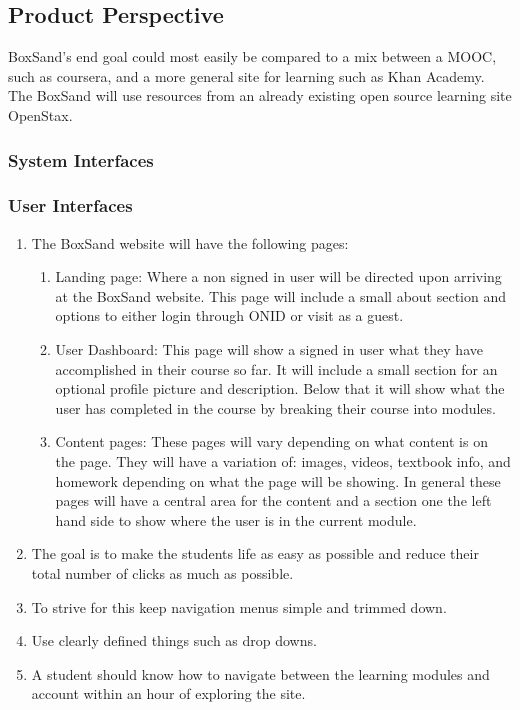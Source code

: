 \documentclass[onecolumn, draftclsnofoot,10pt, compsoc]{IEEEtran}
\begin{document}
\subsection{Product Perspective}
BoxSand's end goal could most easily be compared to a mix between a MOOC, such as coursera, and a more general site for learning such as Khan Academy. The BoxSand will use resources from an already existing open source learning site OpenStax.

\subsubsection{System Interfaces}

\subsubsection{User Interfaces}

\begin{enumerate}
\item The BoxSand website will have the following pages:
\begin{enumerate}
\item Landing page: Where a non signed in user will be directed upon arriving at the BoxSand website. This page will include a small about section and options to either login through ONID or visit as a guest. 
\item User Dashboard: This page will show a signed in user what they have accomplished in their course so far. It will include a small section for an optional profile picture and description. Below that it will show what the user has completed in the course by breaking their course into modules.
\item Content pages: These pages will vary depending on what content is on the page. They will have a variation of: images, videos, textbook info, and homework depending on what the page will be showing. In general these pages will have a central area for the content and a section one the left hand side to show where the user is in the current module. 
\end{enumerate}
\item The goal is to make the students life as easy as possible and reduce their total number of clicks as much as possible. 
\item To strive for this keep navigation menus simple and trimmed down. 
\item Use clearly defined things such as drop downs. 
\item A student should know how to navigate between the learning modules and account within an hour of exploring the site. 
\end{enumerate}
\end{document}
